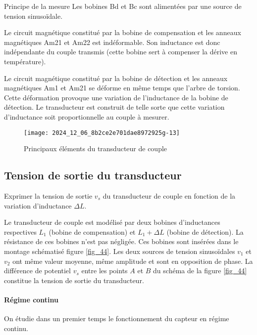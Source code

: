 Principe de la mesure Les bobines Bd et Bc sont alimentées par une source de tension sinusoïdale.

Le circuit magnétique constitué par la bobine de compensation et les anneaux magnétiques Am21 et Am22 est indéformable. Son inductance est donc indépendante du couple transmis (cette bobine sert à compenser la dérive en température).

Le circuit magnétique constitué par la bobine de détection et les anneaux magnétiques Am1 et Am21 se déforme en même temps que l'arbre de torsion. Cette déformation provoque une variation de l'inductance de la bobine de détection. Le transducteur est construit de telle sorte que cette variation d'inductance soit proportionnelle au couple à mesurer.

\begin{figure}[!htb]
\begin{center}
\texttt{[image: 2024\_12\_06\_8b2ce2e701dae8972925g-13]}
\caption{Principaux éléments du transducteur de couple \label{fig_43}}
\end{center}
\end{figure}


\subsection{Tension de sortie du transducteur}

\begin{obj}
Exprimer la tension de sortie  $v_{s}$ du transducteur de couple en fonction de la variation d'inductance  $\Delta L$.
\end{obj}

Le transducteur de couple est modélisé par deux bobines d'inductances respectives \(L_{1}\) (bobine de compensation) et \(L_{1}+\Delta L\) (bobine de détection). La résistance de ces bobines n'est pas négligée. Ces bobines sont insérées dans le montage schématisé figure \ref{fig_44}. Les deux sources de tension sinusoïdales \(v_{1}\) et \(v_{2}\) ont même valeur moyenne, même amplitude et sont en opposition de phase. La différence de potentiel \(v_{s}\) entre les points \(A\) et \(B\) du schéma de la figure \ref{fig_44} constitue la tension de sortie du transducteur.

\paragraph*{Régime continu}
On étudie dans un premier temps le fonctionnement du capteur en régime continu.


